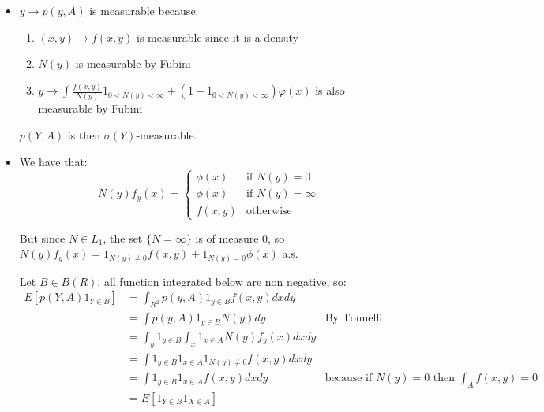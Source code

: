 \documentclass[12pt]{article}
\begin{document}
\begin{itemize}
\item 
$y \rightarrow p(y, A)$ is measurable because:

\begin{enumerate}
\item $(x, y) \rightarrow f(x, y)$ is measurable since it is a density
\item $N(y)$ is measurable by Fubini
\item $y \rightarrow \int \frac{f(x,y)}{N(y)}1_{0 <N(y) <\infty} + (1-1_{0 <N(y) <\infty}) \varphi(x)$ is also measurable by Fubini
\end{enumerate}

$p(Y, A)$ is then $\sigma(Y)$-measurable.


\item 

We have that:
\[N(y) f_y(x) = \left\{ \begin{array}{cc}
\phi(x) & \text{if $N(y) = 0$}\\
\phi(x) & \text{if $N(y) = \infty$}\\
f(x,y) & \text{otherwise}
\end{array}\right. \]


But since $N \in L_1$, the set $\{N = \infty\}$ is of measure 0, so $N(y) f_y(x) = 1_{N(y) \ne 0} f(x,y) + 1_{N(y) = 0}\phi(x)$ a.s.

Let $B \in B(R)$, all function integrated below are non negative, so:
\begin{align*}
E[p(Y, A) 1_{Y \in B}] &= \int_{R^2} p(y, A) 1_{y \in B}f(x,y)dx dy \\
&= \int p(y, A) 1_{y \in B} N(y) dy &\text{By Tonnelli} \\
&= \int_y 1_{y \in B} \int_x 1_{x \in A} N(y) f_y(x) dx dy  \\
&= \int 1_{y \in B} 1_{x \in A} 1_{N(y) \ne 0} f(x, y) dx dy  \\
&= \int 1_{y \in B} 1_{x \in A} f(x, y) dx dy & \text{because if $N(y) = 0$ then $\int_A f(x, y) = 0$} \\
&= E[1_{Y\in B} 1_{X \in A}]
\end{align*}
\end{itemize}
\end{document}
